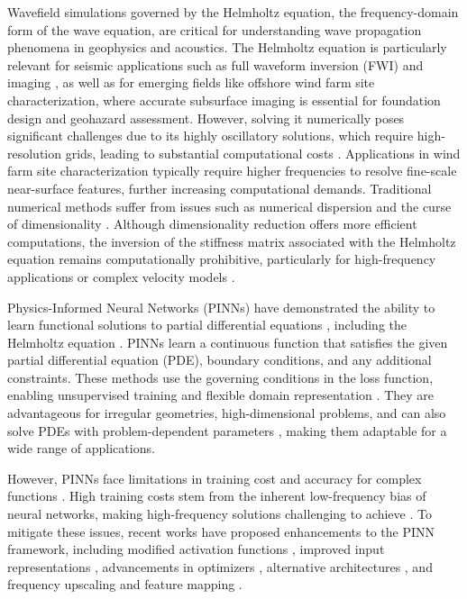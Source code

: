 \documentclass[authoryear, preprint, 12pt]{elsarticle}
\begin{document}
Wavefield simulations governed by the Helmholtz equation, the frequency-domain form of the wave equation, are critical for understanding wave propagation phenomena in geophysics and acoustics. The Helmholtz equation is particularly relevant for seismic applications such as full waveform inversion (FWI) and imaging \citep{pratt1999, sirgue2004}, as well as for emerging fields like offshore wind farm site characterization, where accurate subsurface imaging is essential for foundation design and geohazard assessment. However, solving it numerically poses significant challenges due to its highly oscillatory solutions, which require high-resolution grids, leading to substantial computational costs \citep{Virieux1986, Marfurt1984}. Applications in wind farm site characterization typically require higher frequencies to resolve fine-scale near-surface features, further increasing computational demands. Traditional numerical methods suffer from issues such as numerical dispersion and the curse of dimensionality \citep{Hesthaven2007, Ainsworth2004}. Although dimensionality reduction offers more efficient computations, the inversion of the stiffness matrix associated with the Helmholtz equation remains computationally prohibitive, particularly for high-frequency applications or complex velocity models \citep{wu2023}.


Physics-Informed Neural Networks (PINNs) have demonstrated the ability to learn functional solutions to partial differential equations \citep{raissi2019}, including the Helmholtz equation \citep{song2021}. PINNs learn a continuous function that satisfies the given partial differential equation (PDE), boundary conditions, and any additional constraints. These methods use the governing conditions in the loss function, enabling unsupervised training and flexible domain representation \citep{llanas2006}. They are advantageous for irregular geometries, high-dimensional problems, and can also solve PDEs with problem-dependent parameters \citep{lu2021learning,zou2024seismic,baharlouei2025least}, making them adaptable for a wide range of applications.

However, PINNs face limitations in training cost and accuracy for complex functions \citep{wu2018a, song2023}. High training costs stem from the inherent low-frequency bias of neural networks, making high-frequency solutions challenging to achieve \citep{neal2019, wang2021eigenvector, Alkhalifah2024}. To mitigate these issues, recent works have proposed enhancements to the PINN framework, including modified activation functions \citep{alsafwan2021, waheed2022kronecker}, improved input representations \citep{tancik2020fourier, huang2024}, advancements in optimizers \citep{li2022gradient}, alternative architectures \citep{yang2023fwigan}, and frequency upscaling and feature mapping \citep{chai2024overcoming}.
\end{document}

